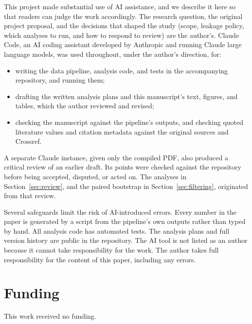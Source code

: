\documentclass[10pt]{article}
\begin{document}
This project made substantial use of AI assistance, and we describe it here
so that readers can judge the work accordingly. The research question, the
original project proposal, and the decisions that shaped the study (scope,
leakage policy, which analyses to run, and how to respond to review) are the
author's. Claude Code, an AI coding assistant developed by Anthropic and
running Claude large language models, was used throughout, under the
author's direction, for:
\begin{itemize}[nosep,leftmargin=1.4em]
\item writing the data pipeline, analysis code, and tests in the
accompanying repository, and running them;
\item drafting the written analysis plans and this manuscript's text,
figures, and tables, which the author reviewed and revised;
\item checking the manuscript against the pipeline's outputs, and checking
quoted literature values and citation metadata against the original sources
and Crossref.
\end{itemize}
A separate Claude instance, given only the compiled PDF, also produced a
critical review of an earlier draft. Its points were checked against the
repository before being accepted, disputed, or acted on. The
analyses in Section~\ref{sec:review}, and the paired bootstrap in
Section~\ref{sec:filtering}, originated from that review.

Several safeguards limit the risk of AI-introduced errors. Every number in
the paper is generated by a script from the pipeline's own outputs rather
than typed by hand. All analysis code has automated tests. The analysis plans
and full version history are public in the repository. The AI tool is not
listed as an author because it cannot take responsibility for the work. The
author takes full responsibility for the content of this paper, including any
errors.

\section*{Funding}

This work received no funding.
\end{document}
